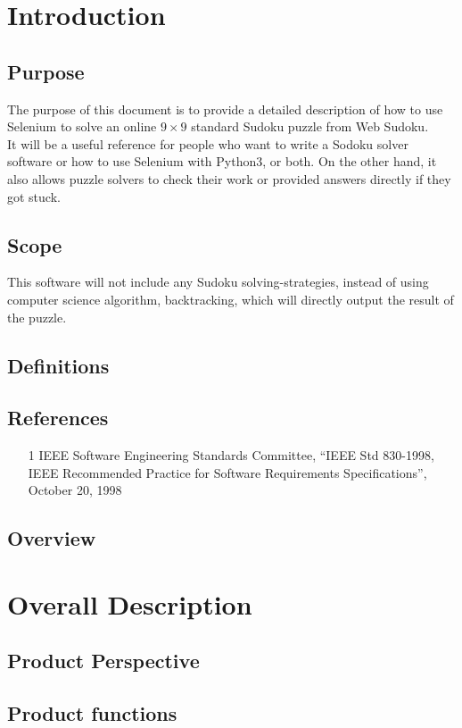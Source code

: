 \documentclass{article}
\title{}
\author{}
\date{}
\begin{document}
\section{Introduction}
	\subsection{Purpose}
	The purpose of this document is to provide a detailed description of how 
	to use Selenium to solve an online $9 \times 9$ standard Sudoku puzzle 
	from Web Sudoku.
	\\[0.5cm]
	It will be a useful reference for people who want to write a Sodoku 
	solver software or how to use Selenium with Python3, or both. On the 
	other hand, it also allows puzzle solvers to check their work or 
	provided answers directly if they got stuck. 
	
	\subsection{Scope}
	This software will not include any Sudoku solving-strategies, instead 
	of using computer science algorithm, backtracking, which will directly 
	output the result of the puzzle.  
	\subsection{Definitions}
	\subsection{References}
	\begin{itemize}
		\item[1] IEEE Software Engineering Standards Committee, ``IEEE
			Std 830-1998, IEEE Recommended Practice for Software
			Requirements Specifications'', October 20, 1998
	\end{itemize}
	\subsection{Overview}

\section{Overall Description}
	\subsection{Product Perspective}
	\subsection{Product functions}
\end{document}
